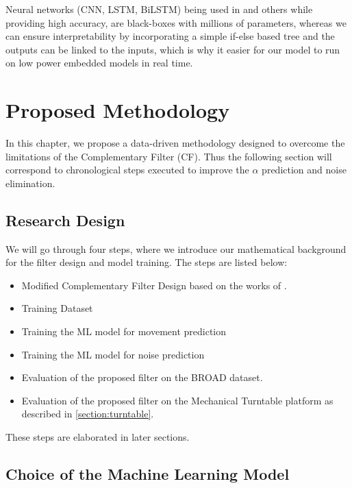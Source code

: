 \documentclass{iutbscthesis}
\begin{document}
Neural networks (CNN, LSTM, BiLSTM) being used in \cite{golroudbari2023cnn6DOF} and others while providing high accuracy, are black-boxes with millions of parameters, whereas we can ensure interpretability by incorporating a simple if-else based tree and the outputs can be linked to the inputs, which is why it easier for our model to run on low power embedded models in real time. 



\chapter{Proposed Methodology} \label{chapter:proposed}
In this chapter, we propose a data-driven methodology designed to overcome the limitations of the Complementary Filter (CF). Thus the following section will correspond to chronological steps executed to improve the $\alpha$ prediction and noise elimination.

\section{Research Design}
We will go through four steps, where we introduce our mathematical background for the filter design and model training. The steps are listed below:
\begin{itemize}
    \item Modified Complementary Filter Design based on the works of \cite{vertzberger2022adaptive}.
    \item Training Dataset
    \item Training the ML model for movement prediction
    \item Training the ML model for noise prediction
    \item Evaluation of the proposed filter on the BROAD \cite{BROAD} dataset.
    \item Evaluation of the proposed filter on the Mechanical Turntable platform as described in \autoref{section:turntable}.
\end{itemize}

These steps are elaborated in later sections.

\section{Choice of the Machine Learning Model}
\end{document}

